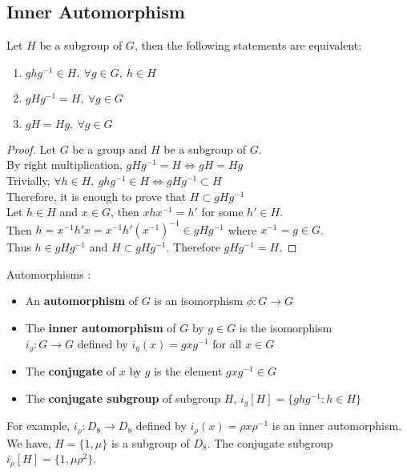 \subsection{Inner Automorphism}
\begin{theorem}
	Let $H$ be a subgroup of $G$, then the following statements are equivalent:
	\begin{enumerate}
		\item $ghg^{-1} \in H,\ \forall g \in G,\ h \in H$
		\item $gHg^{-1} = H,\ \forall g \in G$
		\item $gH = Hg,\ \forall g \in G$
	\end{enumerate}
\end{theorem}
\begin{proof}
	Let $G$ be a group and $H$ be a subgroup of $G$.\\
	By right multiplication,  $gHg^{-1} = H \iff gH = Hg$\\
	Trivially, $\forall h \in H,\ ghg^{-1} \in H \iff gHg^{-1} \subset H$\\
	Therefore, it is enough to prove that $H \subset gHg^{-1}$\\
	Let $h \in H$ and $x \in G$, then $xhx^{-1} = h'$ for some $h' \in H$.\\
	Then $h = x^{-1}h'x = x^{-1}h'(x^{-1})^{-1} \in gHg^{-1}$ where $x^{-1} = g \in G$.\\
	Thus $h \in gHg^{-1}$ and $H \subset gHg^{-1}$. Therefore $gHg^{-1} = H$.
\end{proof}

\begin{definition}Automorphisms : 
	\begin{itemize}
		\item An \textbf{automorphism} of $G$ is an isomorphism $\phi : G \to G$
		\item The \textbf{inner automorphism} of $G$ by $g \in G$ is the isomorphism\\
			$i_g : G \to G$ defined by $i_g(x) = gxg^{-1}$ for all $x \in G$
		\item The \textbf{conjugate} of $x$ by $g$ is the element $gxg^{-1} \in G$
		\item The \textbf{conjugate subgroup} of subgroup $H$, $i_g[H] = \{ ghg^{-1} : h \in H \}$
	\end{itemize}
\end{definition}

\begin{remark}
	For example, $i_\rho : D_8 \to D_8$ defined by $i_\rho(x) = \rho x \rho^{-1}$ is an inner automorphism.
	We have, $H = \{ 1,\mu \}$ is a subgroup of $D_8$.
	The conjugate subgroup $i_\rho[H] = \{ 1,\mu\rho^2 \}$.
\end{remark}

